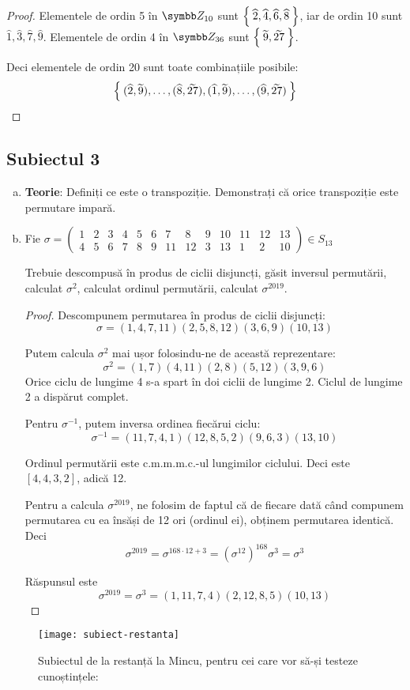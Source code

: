 \begin{enumerate}[(a)]
\begin{proof}
    Elementele de ordin 5 în \(\integersmod{10}\) sunt \(\Set{ \widehat{2}, \widehat{4}, \widehat{6}, \widehat{8} }\), iar de ordin 10 sunt \(\widehat{1}, \widehat{3}, \widehat{7}, \widehat{9}\). Elementele de ordin 4 în \(\integersmod{36}\) sunt \(\Set{ \widetilde{9}, \widetilde{27} }\).

    Deci elementele de ordin 20 sunt toate combinațiile posibile:
    \[
    \Set{ (\widehat{2}, \widetilde{9}), \dots, (\widehat{8}, \widetilde{27}), (\widehat{1}, \widetilde{9}), \dots, (\widehat{9}, \widetilde{27}) }
    \]
    \end{proof}
\end{enumerate}

\subsection*{Subiectul 3}
\begin{enumerate}[(a)]
    \item \textbf{Teorie}: Definiți ce este o transpoziție. Demonstrați că orice transpoziție este permutare impară.

    \item Fie
    \(
    \sigma = \left(\begin{smallmatrix}
    1 & 2 & 3 & 4 & 5 & 6 & 7 & 8 & 9 & 10 & 11 & 12 & 13 \\
    4 & 5 & 6 & 7 & 8 & 9 & 11 & 12 & 3 & 13 & 1 & 2 & 10
    \end{smallmatrix}\right) \in S_{13}
    \)

    Trebuie descompusă în produs de ciclii disjuncți, găsit inversul permutării, calculat \(\sigma^2\), calculat ordinul permutării, calculat \(\sigma^{2019}\).
    \begin{proof}
    Descompunem permutarea în produs de ciclii disjuncți:
    \[
        \sigma = (1, 4, 7, 11) (2, 5, 8, 12) (3, 6, 9) (10, 13)
    \]

    Putem calcula \(\sigma^2\) mai ușor folosindu-ne de această reprezentare:
    \[
        \sigma^2 = (1, 7) (4, 11) (2, 8) (5, 12) (3, 9, 6)
    \]
    Orice ciclu de lungime 4 s-a spart în doi ciclii de lungime 2. Ciclul de lungime 2 a dispărut complet.

    Pentru \(\sigma^{-1}\), putem inversa ordinea fiecărui ciclu:
    \[
        \sigma^{-1} = (11, 7, 4, 1) (12, 8, 5, 2) (9, 6, 3) (13, 10)
    \]

    Ordinul permutării este c.m.m.m.c.-ul lungimilor ciclului. Deci este \([4, 4, 3, 2]\), adică 12.

    Pentru a calcula \(\sigma^{2019}\), ne folosim de faptul că de fiecare dată când compunem permutarea cu ea însăși de 12 ori (ordinul ei), obținem permutarea identică. Deci
    \[
        \sigma^{2019} = \sigma^{168 \cdot 12 + 3} = {(\sigma^{12})}^{168} \sigma^3 = \sigma^3
    \]

    Răspunsul este
    \[
        \sigma^{2019} = \sigma^3 = (1, 11, 7, 4)(2, 12, 8, 5)(10, 13)
    \]
    \end{proof}
\end{enumerate}


\begin{figure}[h]
    \caption*{Subiectul de la restanță la Mincu, pentru cei care vor să-și testeze cunoștințele:}
    \texttt{[image: subiect-restanta]}
    \centering
\end{figure}
